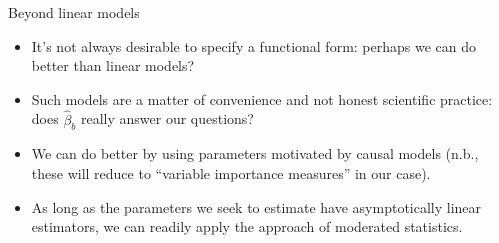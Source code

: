 \documentclass[12pt,t]{beamer}
\begin{document}
\begin{frame}[c]{Beyond linear models}

\begin{center}
\begin{itemize}
  \itemsep12pt
  \item It's not always desirable to specify a functional form: perhaps we can
    do better than linear models?
  \item Such models are a matter of convenience and not honest scientific
    practice: does $\hat{\beta}_{b}$ really answer our questions?
  \item We can do better by using parameters motivated by causal models (n.b.,
    these will reduce to ``variable importance measures'' in our case).
  \item As long as the parameters we seek to estimate have asymptotically linear
    estimators, we can readily apply the approach of moderated statistics.
\end{itemize}
\end{center}

\end{frame}
\end{document}
